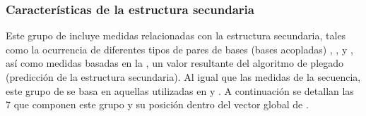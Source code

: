 %
%
\subsubsection{Características de la estructura secundaria}
%
Este grupo de  incluye medidas relacionadas con la
estructura secundaria, tales como la ocurrencia de diferentes tipos de
pares de bases (bases acopladas) , , y , así
como medidas basadas en la , un valor
resultante del algoritmo de plegado (predicción de la estructura
secundaria).  Al igual que las medidas de la secuencia, este grupo
de  se basa en aquellas utilizadas en \cite{ng}
y \cite{batuwita}.  A continuación se detallan las 7  que
componen este grupo y su posición dentro del vector global
de .
